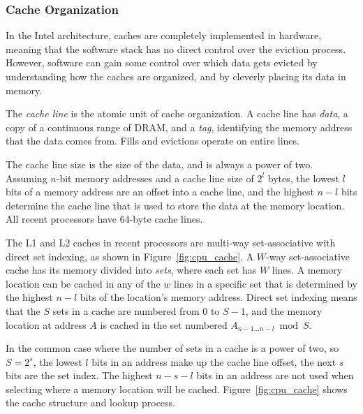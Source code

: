 \subsubsection{Cache Organization}
\label{sec:cache_org}

In the Intel architecture, caches are completely implemented in hardware,
meaning that the software stack has no direct control over the eviction
process. However, software can gain some control over which data gets evicted
by understanding how the caches are organized, and by cleverly placing its data
in memory.

The \textit{cache line} is the atomic unit of cache organization. A cache line
has \textit{data}, a copy of a continuous range of DRAM, and a \textit{tag},
identifying the memory address that the data comes from. Fills and evictions
operate on entire lines.

The cache line size is the size of the data, and is always a power of two.
Assuming $n$-bit memory addresses and a cache line size of $2^{l}$ bytes, the
lowest $l$ bits of a memory address are an offset into a cache line, and the
highest $n - l$ bits determine the cache line that is used to store the data at
the memory location. All recent processors have 64-byte cache lines.

The L1 and L2 caches in recent processors are multi-way set-associative with
direct set indexing, as shown in Figure~\ref{fig:cpu_cache}. A $W$-way
set-associative cache has its memory divided into \textit{sets}, where each set
has $W$ lines. A memory location can be cached in any of the $w$ lines in a
specific set that is determined by the highest $n - l$ bits of the location's
memory address. Direct set indexing means that the $S$ sets in a cache are
numbered from $0$ to $S - 1$, and the memory location at address $A$ is cached
in the set numbered $A_{n - 1 \ldots n - l} \bmod S$.

In the common case where the number of sets in a cache is a power of two, so $S
= 2^{s}$, the lowest $l$ bits in an address make up the cache line offset, the
next $s$ bits are the set index. The highest $n - s - l$ bits in an address are
not used when selecting where a memory location will be cached.
Figure~\ref{fig:cpu_cache} shows the cache structure and lookup process.

